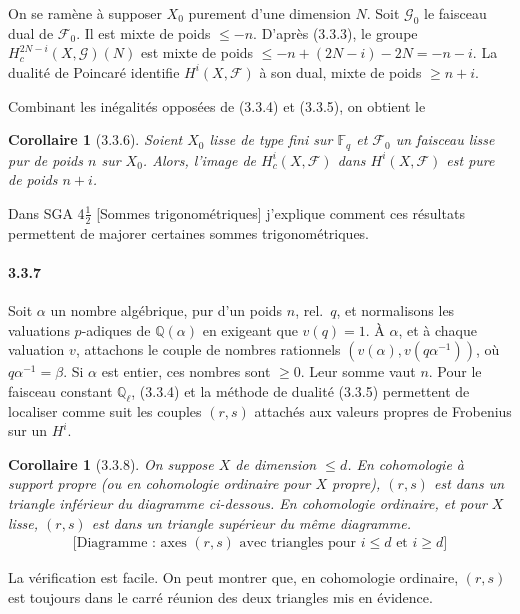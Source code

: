 \documentclass[12pt,a4paper]{article}
\theoremstyle{plain}
\newtheorem{corollary}[theorem]{Corollaire}
\theoremstyle{definition}
\theoremstyle{remark}
\newcommand{\FF}{{\mathbb{F}}}
\newcommand{\QQ}{{\mathbb{Q}}}
\begin{document}
On se ram\`ene \`a supposer $X_0$ purement d'une dimension $N$. Soit $\mathscr{G}_0$ le faisceau dual de $\mathscr{F}_0$. Il est mixte de poids $\leq -n$. D'apr\`es (3.3.3), le groupe $H_c^{2N-i}(X, \mathscr{G})(N)$ est mixte de poids $\leq -n + (2N-i) - 2N = -n - i$. La dualit\'e de Poincar\'e identifie $H^i(X, \mathscr{F})$ \`a son dual, mixte de poids $\geq n + i$.

Combinant les in\'egalit\'es oppos\'ees de (3.3.4) et (3.3.5), on obtient le

\begin{corollary}[3.3.6]
Soient $X_0$ lisse de type fini sur $\FF_q$ et $\mathscr{F}_0$ un faisceau lisse pur de poids $n$ sur $X_0$. Alors, l'image de $H_c^i(X, \mathscr{F})$ dans $H^i(X, \mathscr{F})$ est pure de poids $n + i$.
\end{corollary}

Dans SGA 4$\frac{1}{2}$ [Sommes trigonom\'etriques] j'explique comment ces r\'esultats permettent de majorer certaines sommes trigonom\'etriques.

\paragraph{3.3.7}
Soit $\alpha$ un nombre alg\'ebrique, pur d'un poids $n$, rel.~$q$, et normalisons les valuations $p$-adiques de $\QQ(\alpha)$ en exigeant que $v(q) = 1$. \`A $\alpha$, et \`a chaque valuation $v$, attachons le couple de nombres rationnels $(v(\alpha), v(q\alpha^{-1}))$, o\`u $q\alpha^{-1} = \beta$. Si $\alpha$ est entier, ces nombres sont $\geq 0$. Leur somme vaut $n$. Pour le faisceau constant $\QQ_\ell$, (3.3.4) et la m\'ethode de dualit\'e (3.3.5) permettent de localiser comme suit les couples $(r, s)$ attach\'es aux valeurs propres de Frobenius sur un $H^i$.


\begin{corollary}[3.3.8]
On suppose $X$ de dimension $\leq d$. En cohomologie \`a support propre (ou en cohomologie ordinaire pour $X$ propre), $(r, s)$ est dans un triangle inf\'erieur du diagramme ci-dessous. En cohomologie ordinaire, et pour $X$ lisse, $(r, s)$ est dans un triangle sup\'erieur du m\^eme diagramme.
\[
\begin{array}{c}
\text{[Diagramme : axes $(r, s)$ avec triangles pour $i \leq d$ et $i \geq d$]}
\end{array}
\]
\end{corollary}

La v\'erification est facile. On peut montrer que, en cohomologie ordinaire, $(r, s)$ est toujours dans le carr\'e r\'eunion des deux triangles mis en \'evidence.
\end{document}
